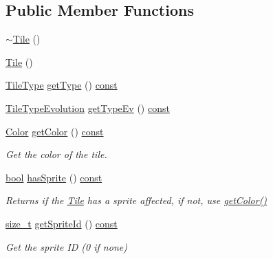 \subsection*{Public Member Functions}
\begin{DoxyCompactItemize}
\item 
\hyperlink{classarcade_1_1_tile_a38f5ed9f2ae16dbd42fa736ed5c984a6}{$\sim$\-Tile} ()
\item 
\hyperlink{classarcade_1_1_tile_af1100b8701dcd96579dd6e2b7a3415bd}{Tile} ()
\item 
\hyperlink{namespacearcade_a61ba576694ea309cdf2b4b66902408ca}{Tile\-Type} \hyperlink{classarcade_1_1_tile_a83bd8295ca7bf4e952c372581fcbd337}{get\-Type} () \hyperlink{term__entry_8h_a57bd63ce7f9a353488880e3de6692d5a}{const} 
\item 
\hyperlink{namespacearcade_a2e0a64a64203f78c9efb84a1475a8cf4}{Tile\-Type\-Evolution} \hyperlink{classarcade_1_1_tile_a8a81d038b707ae5b2d38e6ff820c8c92}{get\-Type\-Ev} () \hyperlink{term__entry_8h_a57bd63ce7f9a353488880e3de6692d5a}{const} 
\item 
\hyperlink{unionarcade_1_1_color}{Color} \hyperlink{classarcade_1_1_tile_afe29bdead41e0a17d84860bccb07542f}{get\-Color} () \hyperlink{term__entry_8h_a57bd63ce7f9a353488880e3de6692d5a}{const} 
\begin{DoxyCompactList}\small\item\em Get the color of the tile. \end{DoxyCompactList}\item 
\hyperlink{term__entry_8h_a002004ba5d663f149f6c38064926abac}{bool} \hyperlink{classarcade_1_1_tile_a2584f423e04a31332578a6cde00822a6}{has\-Sprite} () \hyperlink{term__entry_8h_a57bd63ce7f9a353488880e3de6692d5a}{const} 
\begin{DoxyCompactList}\small\item\em Returns if the \hyperlink{classarcade_1_1_tile}{Tile} has a sprite affected, if not, use \hyperlink{classarcade_1_1_tile_afe29bdead41e0a17d84860bccb07542f}{get\-Color()} \end{DoxyCompactList}\item 
\hyperlink{nc__alloc_8h_a7b60c5629e55e8ec87a4547dd4abced4}{size\-\_\-t} \hyperlink{classarcade_1_1_tile_ac4ba05e83420a4d781a200480ed59e88}{get\-Sprite\-Id} () \hyperlink{term__entry_8h_a57bd63ce7f9a353488880e3de6692d5a}{const} 
\begin{DoxyCompactList}\small\item\em Get the sprite I\-D (0 if none) \end{DoxyCompactList}\item 

\end{DoxyCompactItemize}
